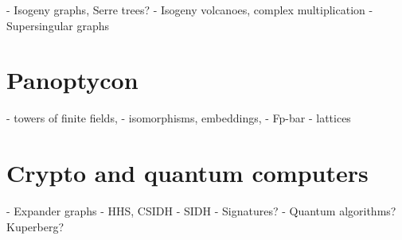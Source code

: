 \documentclass{report}
\theoremstyle{plain}
\theoremstyle{definition}
\begin{document}
- Isogeny graphs, Serre trees?
- Isogeny volcanoes, complex multiplication
- Supersingular graphs


\chapter{Panoptycon}
\label{cha:fpbar}

- towers of finite fields,
- isomorphisms, embeddings,
- Fp-bar
- lattices


\chapter{Crypto and quantum computers}
\label{cha:crypto}

- Expander graphs
- HHS, CSIDH
- SIDH
- Signatures?
- Quantum algorithms? Kuperberg?


\clearpage


\end{document}
